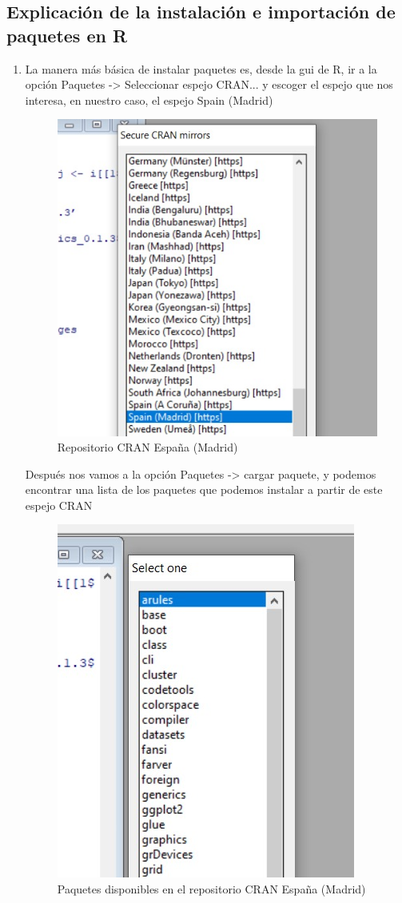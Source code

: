 \documentclass[parskip=full]{scrartcl}
\begin{document}
\subsection{Explicación de la instalación e importación de paquetes en R}

\begin{enumerate}

\item 
La manera más básica de instalar paquetes es, desde la gui de R, ir a la opción Paquetes -> Seleccionar espejo CRAN... y escoger el espejo que nos interesa, en nuestro caso, el espejo Spain (Madrid)
\begin{figure}[H]
\centering
\includegraphics[width=0.5\linewidth]{images/cran_mirror.jpeg}
\caption{\label{fig:cran_mirror_image}Repositorio CRAN España (Madrid)}
\end{figure}
Después nos vamos a la opción Paquetes -> cargar paquete, y podemos encontrar una lista de los paquetes que podemos instalar a partir de este espejo CRAN
\begin{figure}[H]
\centering
\includegraphics[width=0.5\linewidth]{images/cran_mirror_packages.jpeg}
\caption{\label{fig:cran_mirror_packages}Paquetes disponibles en el repositorio CRAN España (Madrid)}
\end{figure}


\end{enumerate}
\end{document}
